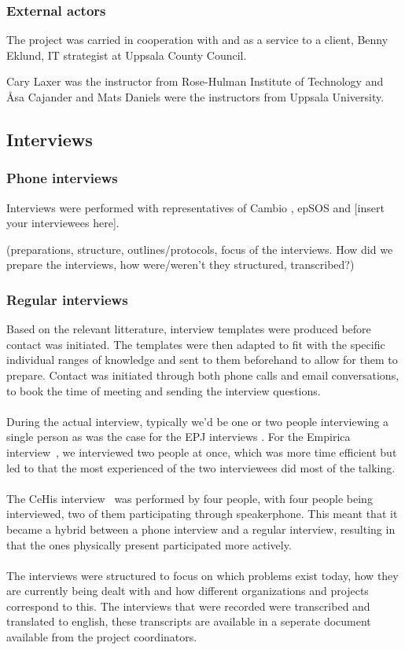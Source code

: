 \documentclass[14pt]{article}
\begin{document}
\subsubsection{External actors}
The project was carried in cooperation with and as a service to a client, Benny Eklund, IT strategist at Uppsala County Council.

Cary Laxer was the instructor from Rose-Hulman Institute of Technology and Åsa Cajander and Mats Daniels were the instructors from Uppsala University.

\subsection{Interviews}
\subsubsection{Phone interviews}

Interviews were performed with representatives of Cambio \cite{Cambio}, epSOS \cite{epSOS} and [insert your interviewees here].

(preparations, structure, outlines/protocols, focus of the interviews.
How did we prepare the interviews, how were/weren't they structured, transcribed?)

\subsubsection{Regular interviews}

Based on the relevant litterature, interview templates were produced before contact was initiated. The templates were then adapted to fit with the specific individual ranges of knowledge and sent to them beforehand to allow for them to prepare. Contact was initiated through both phone calls and email conversations, to book the time of meeting and sending the interview questions.
\\\\
During the actual interview, typically we'd be one or two people interviewing a single person as was the case for the EPJ interviews \cite{EPJ1} \cite{EPJ2}. For the Empirica interview~\cite{Empirica}, we interviewed two people at once, which was more time efficient but led to that the most experienced of the two interviewees did most of the talking.
\\\\
The CeHis interview~\cite{CeHis} was performed by four people, with four people being interviewed, two of them participating through speakerphone. This meant that it became a hybrid between a phone interview and a regular interview, resulting in that the ones physically present participated more actively. 
\\\\
The interviews were structured to focus on which problems exist today, how they are currently being dealt with and how different organizations and projects correspond to this. The interviews that were recorded were transcribed and translated to english, these transcripts are available in a seperate document available from the project coordinators.
\end{document}
